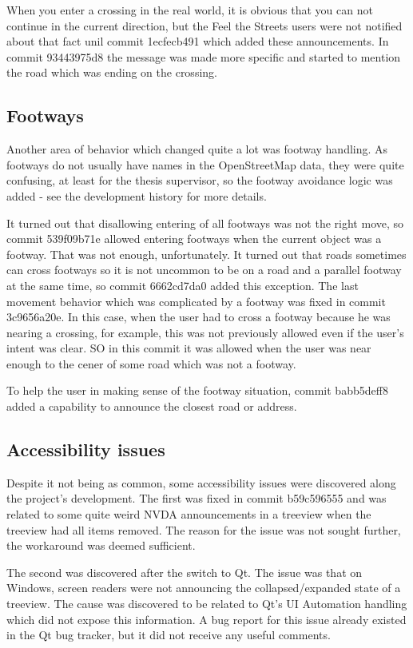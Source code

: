 \documentclass[nolof,digital]{fithesis3}
\begin{document}
When you enter  a crossing in the real world, it is obvious that you can not continue in the current direction, but the Feel the Streets users were not notified about that fact unil commit 1ecfecb491 which added these announcements. In commit 93443975d8 the message was made more specific and started to mention the road which was ending on the crossing.
\subsection{Footways}
Another area of behavior which changed quite a lot was footway handling. As footways do not usually have names in the OpenStreetMap data, they were quite confusing, at least for the thesis supervisor, so the footway avoidance logic was added - see the development history for more details.

It turned out that disallowing entering of all footways was not the right move, so commit 539f09b71e allowed entering footways when the current object was a footway. That was not enough, unfortunately. It turned out that roads sometimes can cross footways so it is not uncommon to be on a road and a parallel footway at the same time, so commit 6662cd7da0 added this exception. The last movement behavior which was complicated by a footway was fixed in commit 3c9656a20e. In this case, when the user had to cross a footway because he was nearing a crossing, for example, this was not previously allowed even if the user's intent was clear. SO in this commit it was allowed when the user was near enough to the cener of some road which was not a footway.

To help the user in making sense of the footway situation, commit babb5deff8 added a capability to announce the closest road or address.
\subsection{Accessibility issues}
Despite it not being as common, some accessibility issues were discovered along the project's development. The first was fixed in commit b59c596555 and was related to some quite weird NVDA announcements in a treeview when the treeview had all items removed. The reason for the issue was not sought further, the workaround was deemed sufficient.

The second was discovered after the switch to Qt. The issue was that on Windows, screen readers were not announcing the collapsed/expanded state of a treeview. The cause was discovered to be related to Qt's UI Automation handling which did not expose this information. A bug report for this issue already existed in the Qt bug tracker, but it did not receive any useful comments.
\end{document}
